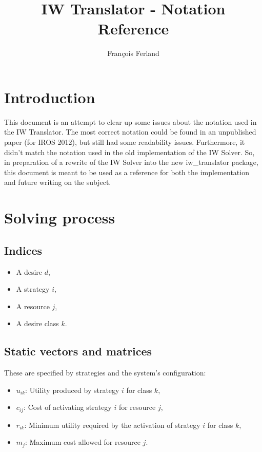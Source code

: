 \documentclass[12pt]{article}
\begin{document}
\author{François Ferland}
\title{IW Translator - Notation Reference}

\maketitle

\section*{Introduction}

This document is an attempt to clear up some issues about the notation used in the IW Translator.
The most correct notation could be found in an unpublished paper (for IROS 2012), but still had some readability issues.
Furthermore, it didn't match the notation used in the old implementation of the IW Solver.
So, in preparation of a rewrite of the IW Solver into the new iw\_translator package, this document is meant to be used as a reference for both the implementation and future writing on the subject.

\section*{Solving process}

\subsection*{Indices}

\begin{itemize}
	\item A desire $d$,
	\item A strategy $i$,
	\item A resource $j$,
	\item A desire class $k$.
\end{itemize}

\subsection*{Static vectors and matrices}

These are specified by strategies and the system's configuration:

\begin{itemize}
	\item $u_{ik}$: Utility produced by strategy $i$ for class $k$,
	\item $c_{ij}$: Cost of activating strategy $i$ for resource $j$,
	\item $r_{ik}$: Minimum utility required by the activation of strategy $i$ for class $k$,
	\item $m_{j}$: Maximum cost allowed for resource $j$.
\end{itemize}
\end{document}
